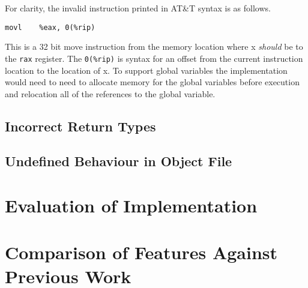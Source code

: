 For clarity, the invalid instruction printed in AT\&T syntax is as follows.

\lstinline{movl    %eax, 0(%rip)}

This is a 32 bit move instruction from the memory location where x \textit{should} be to the \lstinline{rax} register. The \lstinline{0(%rip)} is syntax for an offset from the current instruction location to the location of x. To support global variables the implementation would need to need to allocate memory for the global variables before execution and relocation all of the references to the global variable.

\subsection{Incorrect Return Types}

\subsection{Undefined Behaviour in Object File}

\section{Evaluation of Implementation}

\section{Comparison of Features Against Previous Work}

